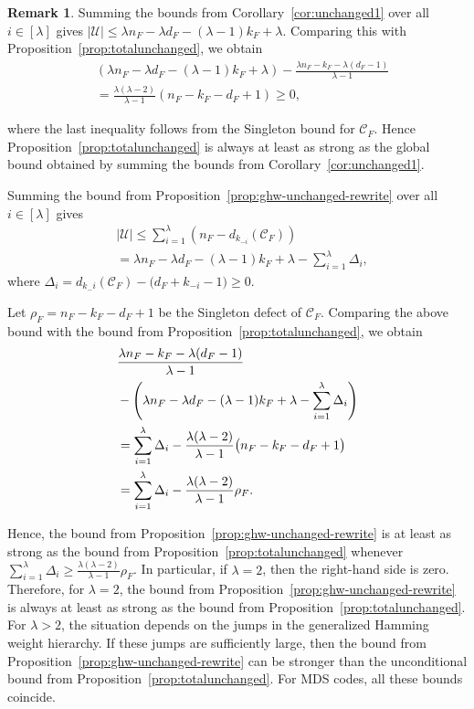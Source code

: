 \documentclass[conference, 10pt]{IEEEtran}
\theoremstyle{plain}
\theoremstyle{definition}
\newtheorem{remark}[definition]{Remark}
\newcommand{\mC}{\mathcal{C}}
\newcommand{\mU}{\mathcal{U}}
\begin{document}
\begin{remark}\label{rem:ghw-write-comparison-rewrite}
Summing the bounds from Corollary~\ref{cor:unchanged1} over all $i\in [\lambda]$ gives $|\mU|\le \lambda n_F-\lambda d_F-(\lambda-1)k_F+\lambda$. 
Comparing this with Proposition~\ref{prop:totalunchanged}, we obtain
\begin{align*}
&\left(\lambda n_F-\lambda d_F-(\lambda-1)k_F+\lambda\right)-\frac{\lambda n_F-k_F-\lambda(d_F-1)}{\lambda-1}\\ &=\frac{\lambda(\lambda-2)}{\lambda-1}(n_F-k_F-d_F+1)\ge 0,
\end{align*}

where the last inequality follows from the Singleton bound for $\mC_F$. Hence Proposition~\ref{prop:totalunchanged} is always at least as strong as the global bound obtained by summing the bounds from Corollary~\ref{cor:unchanged1}. 

Summing the bound from Proposition~\ref{prop:ghw-unchanged-rewrite} over all $i\in[\lambda]$ gives 
\begin{align*} 
&|\mU| \leq \sum_{i=1}^{\lambda}\left(n_F-d_{k_{-i}}(\mC_F)\right)\\
&= \lambda n_F-\lambda d_F-(\lambda-1)k_F+\lambda -\sum_{i=1}^{\lambda}\Delta_i, \end{align*}
where $\Delta_i = d_{k_-i}(\mathcal C_F)-\bigl(d_F+k_{-i}-1\bigr) \geq 0$. 

Let $\rho_F=n_F-k_F-d_F+1$ be the Singleton defect of $\mC_F$. Comparing the above bound with the bound from Proposition~\ref{prop:totalunchanged}, we obtain 
\begin{align*} &\frac{\lambda n_F-k_F-\lambda(d_F-1)}{\lambda-1} \\
&-\left( \lambda n_F-\lambda d_F-(\lambda-1)k_F+\lambda -\sum_{i=1}^{\lambda}\Delta_i \right) \notag\\ & = \sum_{i=1}^{\lambda}\Delta_i -\frac{\lambda(\lambda-2)}{\lambda-1} \bigl(n_F-k_F-d_F+1\bigr)\\
&= \sum_{i=1}^{\lambda}\Delta_i -\frac{\lambda(\lambda-2)}{\lambda-1}\rho_F . \end{align*}

Hence, the bound from Proposition~\ref{prop:ghw-unchanged-rewrite} is at least as strong as the bound from Proposition~\ref{prop:totalunchanged} whenever $\sum_{i=1}^{\lambda}\Delta_i \geq \frac{\lambda(\lambda-2)}{\lambda-1}\rho_F$.  In particular, if $\lambda=2$, then the right-hand side is zero. Therefore, for $\lambda=2$, the bound from Proposition~\ref{prop:ghw-unchanged-rewrite} is always at least as strong as the bound from Proposition~\ref{prop:totalunchanged}. For $\lambda>2$, the situation depends on the jumps in the generalized Hamming weight hierarchy. If these jumps are sufficiently large, then the bound from Proposition~\ref{prop:ghw-unchanged-rewrite} can be stronger than the unconditional bound from Proposition~\ref{prop:totalunchanged}. For MDS codes, all these bounds coincide.


\end{remark}
\end{document}
